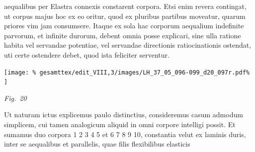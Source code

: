%
 aequalibus per Elastra\protect{} connexis%
\protect{} constarent corpora. Etsi enim revera contingat, ut %
corpus majus\protect{} 
%
%
 hoc ex eo oritur, quod ex pluribus partibus moveatur, quarum priores %
vim\protect{} jam consumsere. Itaque ex sola hac 
%
%
%
corporum aequalium indefinite parvorum, et infinite durorum,%
\protect{}\protect{} debent omnia posse explicari,  
%
sine ulla ratione habita vel servandae potentiae,%
\protect{} vel servandae directionis%
\protect{} 
%
%
ratiocinationis ostendat, uti certe ostendere debet, quod ista feliciter serventur. 
\pend
%
\vspace{2.0em} %
\centerline{%
\texttt{[image: \%
gesamttex/edit\_VIII,3/images/LH\_37\_05\_096-099\_d20\_097r.pdf\%
]}} 
\vspace{0.5em}
\centerline{%
\lbrack\textit{Fig.~20}\rbrack%
}
\vspace{1.5em}
%
\pstart
\hspace{1mm}\hspace{-1mm}%
%
Ut naturam ictus\protect{}%
\protect{} explicemus paulo distinctius, consideremus casum admodum simplicem, cui tamen analogicum 
%
 aliquid in omni corpore intelligi possit. Et sumamus duo corpora 1 2 3 4 5 et 6 7 8 9 10, constantia velut ex  
%
laminis\protect{} duris, inter se aequalibus et parallelis,%
\protect{} quae filis flexibilibus elasticis%
\protect{}  
